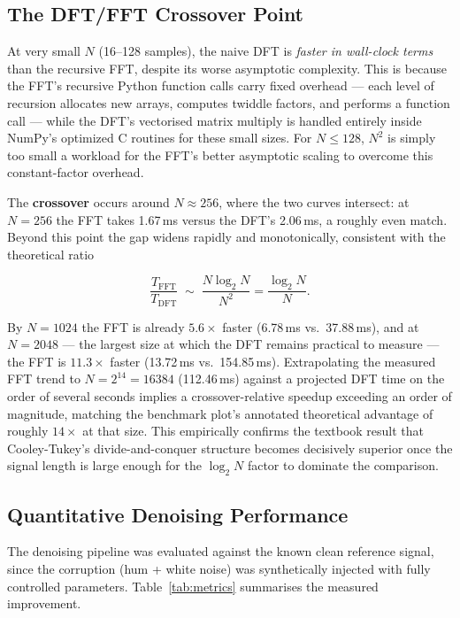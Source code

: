 \documentclass[11pt]{article}
\begin{document}
\subsection{The DFT/FFT Crossover Point}

At very small $N$ (16--128 samples), the naive DFT is \emph{faster in wall-clock
terms} than the recursive FFT, despite its worse asymptotic complexity. This is
because the FFT's recursive Python function calls carry fixed overhead ---
each level of recursion allocates new arrays, computes twiddle factors, and
performs a function call --- while the DFT's vectorised matrix multiply is
handled entirely inside NumPy's optimized C routines for these small sizes.
For $N \le 128$, $N^2$ is simply too small a workload for the FFT's better
asymptotic scaling to overcome this constant-factor overhead.

The \textbf{crossover} occurs around $N \approx 256$, where the two curves
intersect: at $N=256$ the FFT takes 1.67\,ms versus the DFT's 2.06\,ms, a
roughly even match. Beyond this point the gap widens rapidly and
monotonically, consistent with the theoretical ratio

\begin{equation}
\frac{T_{\text{FFT}}}{T_{\text{DFT}}} \;\sim\; \frac{N\log_2 N}{N^2} = \frac{\log_2 N}{N}.
\end{equation}

By $N=1024$ the FFT is already $5.6\times$ faster (6.78\,ms vs.\ 37.88\,ms), and
at $N=2048$ --- the largest size at which the DFT remains practical to measure
--- the FFT is $11.3\times$ faster (13.72\,ms vs.\ 154.85\,ms). Extrapolating
the measured FFT trend to $N=2^{14}=16384$ (112.46\,ms) against a projected
DFT time on the order of several seconds implies a crossover-relative
speedup exceeding an order of magnitude, matching the benchmark plot's
annotated theoretical advantage of roughly $14\times$ at that size. This
empirically confirms the textbook result that Cooley-Tukey's divide-and-conquer
structure becomes decisively superior once the signal length is large enough
for the $\log_2 N$ factor to dominate the comparison.

\subsection{Quantitative Denoising Performance}

The denoising pipeline was evaluated against the known clean reference
signal, since the corruption (hum + white noise) was synthetically
injected with fully controlled parameters. Table~\ref{tab:metrics}
summarises the measured improvement.
\end{document}
